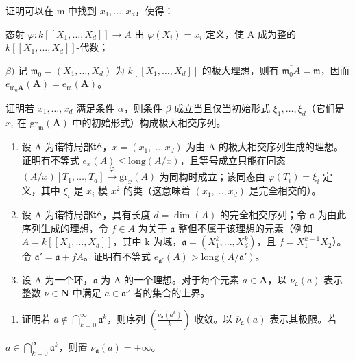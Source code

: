 证明可以在 m 中找到 \(x_{1},\ldots,x_{d}\)，使得：

  态射 \(\varphi:k[[X_{1},...,X_{d}]]\to A\) 由 \(\varphi(X_{i})=x_{i}\) 定义，使 A 成为整的 \(k[[X_{1},...,X_{d}]]\)-代数；

\(\beta)\) 记 \(\mathfrak{m}_0 = (X_1, \ldots, X_d)\) 为 \(k[[X_1, \ldots, X_d]]\) 的极大理想，则有 \(\overline{\mathfrak{m}_0A} = \mathfrak{m}\)，因而 \(e_{\mathfrak{m}_0\mathbf{A}}(\mathbf{A}) = e_{\mathfrak{m}}(\mathbf{A})\)。

  证明若 \(x_{1},\ldots,x_{d}\) 满足条件 \(\alpha\)，则条件 \(\beta\) 成立当且仅当初始形式 \(\xi_{1},\ldots,\xi_{d}\)（它们是 \(x_{i}\) 在 \(\mathrm{gr}_{\mathfrak{m}}(\mathbf{A})\) 中的初始形式）构成极大相交序列。

\begin{enumerate}
\def\labelenumi{\arabic{enumi})}
\setcounter{enumi}{15}
\item
  设 A 为诺特局部环，\(x = (x_1, \ldots, x_d)\) 为由 A 的极大相交序列生成的理想。证明有不等式 \(e_x(A) \leqslant \text{long}(A/x)\)，且等号成立只能在同态 \((A/x)[T_1, \ldots, T_d] \xrightarrow{\varphi} \text{gr}_x(A)\) 为同构时成立；该同态由 \(\varphi(T_i) = \xi_i\) 定义，其中 \(\xi_i\) 是 \(x_i\) 模 \(x^2\) 的类（这意味着 \((x_1, \ldots, x_d)\) 是完全相交的）。
\item
  设 A 为诺特局部环，具有长度 \(d = \dim(A)\) 的完全相交序列；令 \(\mathfrak{a}\) 为由此序列生成的理想，令 \(f \in A\) 为关于 \(\mathfrak{a}\) 整但不属于该理想的元素（例如 \(A = k[[X_1, ..., X_d]]\)，其中 k 为域，\(\mathfrak{a} = (X_1^k, ..., X_d^k)\)，且 \(f = X_1^{k-1}X_2\)）。令 \(\mathfrak{a}' = \mathfrak{a} + fA\)。证明有不等式 \(e_{\mathfrak{a}'}(A) > \text{long}(A/\mathfrak{a}')\)。
\item
  设 A 为一个环，\(\mathfrak{a}\) 为 A 的一个理想。对于每个元素 \(a \in \mathbf{A}\)，以 \(\nu_{\mathfrak{a}}(a)\) 表示整数 \(\nu \in \mathbf{N}\) 中满足 \(a \in \mathfrak{a}^{\nu}\) 者的集合的上界。
\end{enumerate}

\begin{enumerate}
\def\labelenumi{\alph{enumi})}
\tightlist
\item
  证明若 \(a \notin \bigcap_{k=0}^{\infty} \mathfrak{a}^k\)，则序列 \(\left(\frac{\nu_{\mathfrak{a}}(a^k)}{k}\right)\) 收敛。以 \(\overline{\nu}_{\mathfrak{a}}(a)\) 表示其极限。若
\end{enumerate}

\(a \in \bigcap_{k=0}^{\infty} \mathfrak{a}^{k}\)，则置 \(\overline{\nu}_{\mathfrak{a}}(a) = +\infty\)。

